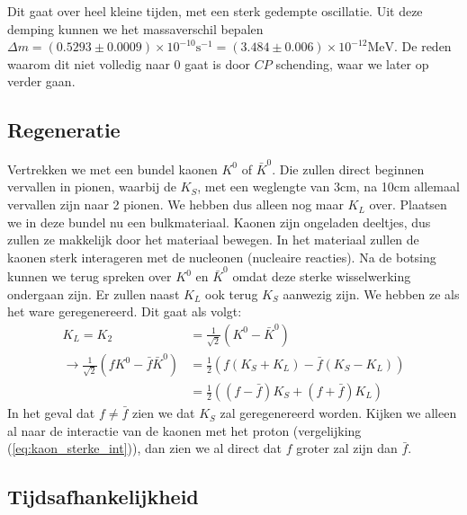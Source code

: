 \documentclass[../main.tex]{subfiles}
\begin{document}
Dit gaat over heel kleine tijden, met een sterk gedempte oscillatie. Uit deze demping kunnen we het massaverschil bepalen $\Delta m=(0.5293 \pm 0.0009) \times 10^{-10} \text{s}^{-1} = (3.484 \pm 0.006) \times 10^{-12} \text{MeV}$. De reden waarom dit niet volledig naar 0 gaat is door $CP$ schending, waar we later op verder gaan.

\subsection{Regeneratie}%
\label{sub:regeneratie}

Vertrekken we met een bundel kaonen $K^0$ of $\bar{K}^0$. Die zullen direct beginnen vervallen in pionen, waarbij de $K_S$, met een weglengte van 3cm, na 10cm allemaal vervallen zijn naar 2 pionen. We hebben dus alleen nog maar $K_L$ over. Plaatsen we in deze bundel nu een bulkmateriaal. Kaonen zijn ongeladen deeltjes, dus zullen ze makkelijk door het materiaal bewegen. In het materiaal zullen de kaonen sterk interageren met de nucleonen (nucleaire reacties). Na de botsing kunnen we terug spreken over $K^0$ en $\bar{K}^0$ omdat deze sterke wisselwerking ondergaan zijn. Er zullen naast $K_L$ ook terug $K_S$ aanwezig zijn. We hebben ze als het ware geregenereerd. Dit gaat als volgt:
\begin{equation}
    \begin{aligned}
        \label{eq:ks_regen}
        K_{L}=K_{2}&=\frac{1}{\sqrt{2}}\left(K^{0}-\bar{K}^{0}\right)\\
        \rightarrow \frac{1}{\sqrt{2}}\left(f K^{0}-\bar{f} \bar{K}^{0}\right)&=\frac{1}{2}\left(f\left(K_{S}+K_{L}\right)-\bar{f}\left(K_{S}-K_{L}\right)\right) \\
                                                                              &=\frac{1}{2}\left((f-\bar{f}) K_{S}+(f+\bar{f}) K_{L}\right)
    \end{aligned}
\end{equation}
In het geval dat $f\neq \bar{f}$ zien we dat $K_S$ zal geregenereerd worden. Kijken we alleen al naar de interactie van de kaonen met het proton (vergelijking (\ref{eq:kaon_sterke_int})), dan zien we al direct dat $f$ groter zal zijn dan $\bar{f}$.

\subsection{Tijdsafhankelijkheid}%
\label{sub:tijd_afhankelijkheid}
\end{document}

